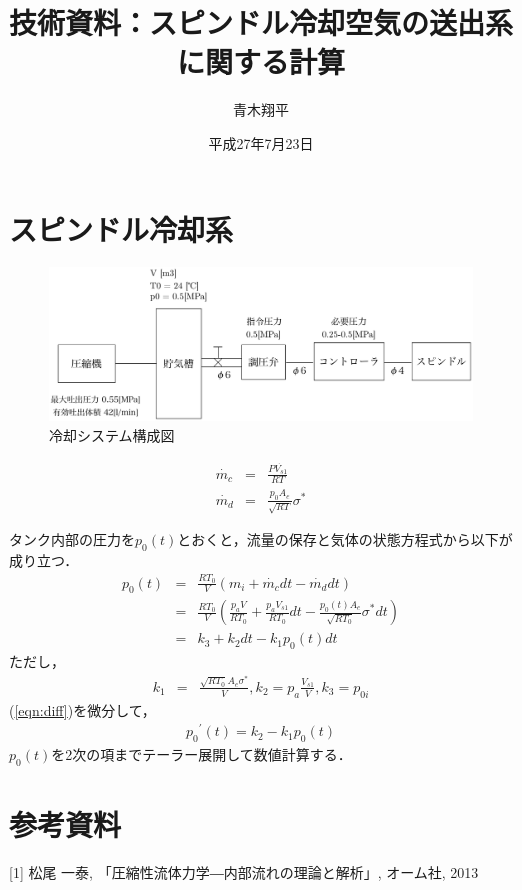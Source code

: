 \documentclass{jsarticle}
\begin{document}
\title{技術資料：スピンドル冷却空気の送出系に関する計算}
\author{青木翔平}
\date{平成27年7月23日}

\section{スピンドル冷却系}

\begin{figure}[htbp]
 \centering
 \includegraphics[width=150mm]{system.pdf}
 \caption{冷却システム構成図}
 \label{fig:solar_massage}
\end{figure}

\begin{eqnarray}
  \dot{m_c} & = &  \frac{P\dot{V_{s1}}}{RT}  \\
  \dot{m_d} & = & \frac{p_0 A_e }{\sqrt{R T}}\sigma^{*}
\end{eqnarray}

タンク内部の圧力を$p_0(t)$とおくと，流量の保存と気体の状態方程式から以下が成り立つ．
\begin{eqnarray}
  p_0(t) & = & \frac{R T_0}{V} \left( m_i + \dot{m_c} dt - \dot{m_d} dt \right) \nonumber \\
  & = & \frac{R T_0}{V} \left( \frac{p_a V}{R T_0} + \frac{p_a V_{s1}}{R T_0}dt - \frac{p_0(t) A_e}{\sqrt{R T_0}} \sigma^{*} dt \right) \nonumber \\
  & = & k_3 + k_2 dt - k_1 p_0(t) dt \label{eqn:diff} 
\end{eqnarray}
ただし，
\begin{eqnarray}
  k_1 & = & \frac{\sqrt{R T_0} A_e \sigma^{*}}{V}, k_2 = p_a \frac{V_{s1}}{V}, k_3 = p_{0i}
\end{eqnarray}
(\ref{eqn:diff})を微分して，
\begin{eqnarray}
  {p_0}^{\prime}(t) = k_2 - k_1 p_0(t)
\end{eqnarray}
$p_0(t)$を2次の項までテーラー展開して数値計算する．



\section{参考資料}
[1] 松尾 一泰, 「圧縮性流体力学―内部流れの理論と解析」, オーム社, 2013
\end{document}
